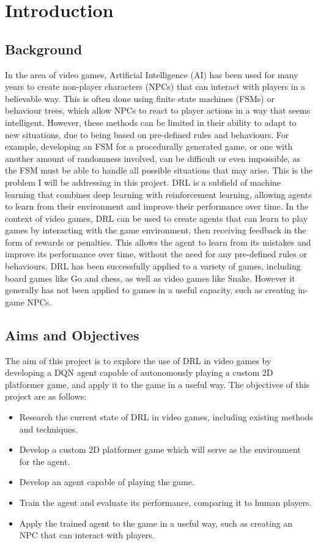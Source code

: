 \chapter{Introduction}

\section{Background}
In the area of video games, Artificial Intelligence (AI) has been used for many years to create non-player characters (NPCs) that can interact with players in a believable way.
This is often done using finite state machines (FSMs) or behaviour trees, which allow NPCs to react to player actions in a way that seems intelligent. 
However, these methods can be limited in their ability to adapt to new situations, due to being based on pre-defined rules and behaviours. 
For example, developing an FSM for a procedurally generated game, or one with another amount of randomness involved, can be difficult or even impossible, as the FSM must be able to handle all possible situations that may arise.
This is the problem I will be addressing in this project.
DRL is a subfield of machine learning that combines deep learning with reinforcement learning, allowing agents to learn from their environment and improve their performance over time.
In the context of video games, DRL can be used to create agents that can learn to play games by interacting with the game environment, then receiving feedback in the form of rewards or penalties.
This allows the agent to learn from its mistakes and improve its performance over time, without the need for any pre-defined rules or behaviours.
DRL has been successfully applied to a variety of games, including board games like Go and chess, as well as video games like Snake.
However it generally has not been applied to games in a useful capacity, such as creating in-game NPCs.

\section{Aims and Objectives}
The aim of this project is to explore the use of DRL in video games by developing a DQN agent capable of autonomously playing a custom 2D platformer game, and apply it to the game in a useful way.
The objectives of this project are as follows:
\begin{itemize}
    \item Research the current state of DRL in video games, including existing methods and techniques.
    \item Develop a custom 2D platformer game which will serve as the environment for the agent.
    \item Develop an agent capable of playing the game.
    \item Train the agent and evaluate its performance, comparing it to human players.
    \item Apply the trained agent to the game in a useful way, such as creating an NPC that can interact with players.
\end{itemize}


